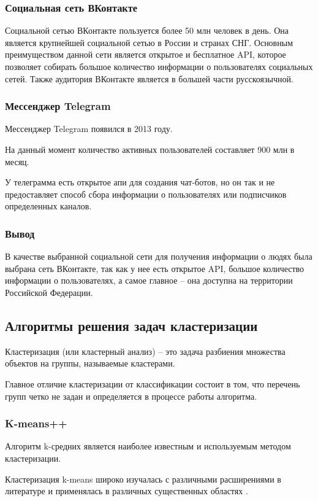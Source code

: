 \subsubsection{Социальная сеть ВКонтакте}
Социальной сетью ВКонтакте пользуется более 50 млн человек в день. Она является крупнейшей социальной сетью в России и странах СНГ. Основным преимуществом данной сети является открытое и бесплатное API, которое позволяет собирать большое количество информации о пользователях социальных сетей. Также аудитория ВКонтакте является в большей части русскоязычной.

\subsubsection{Мессенджер Telegram}
Мессенджер Telegram появился в 2013 году.

На данный момент количество активных пользователей составляет 900 млн в месяц.

У телеграмма есть открытое апи для создания чат-ботов, но он так и не предоставляет способ сбора информации о пользователях или подписчиков определенных каналов.

\subsubsection{Вывод}
В качестве выбранной социальной сети для получения информации о людях была выбрана сеть ВКонтакте, так как у нее есть открытое API, большое количество информации о пользователях, а самое главное -- она доступна на территории Российской Федерации.

\subsection{Алгоритмы решения задач кластеризации}
Кластеризация (или кластерный анализ) \cite{ershov2016} -- это задача разбиения множества объектов на группы, называемые кластерами.

Главное отличие кластеризации от классификации состоит в том, что перечень групп четко не задан и определяется в процессе работы алгоритма. 

\subsubsection{K-means++}

Алгоритм k-средних является наиболее известным и используемым методом кластеризации. 

Кластеризация k-means широко изучалась с различными расширениями в литературе и применялась в различных существенных областях \cite{alhawarat2018revisiting}.

